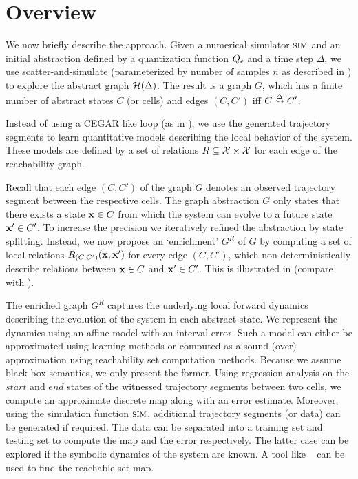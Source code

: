 \section{Overview}
\label{sec:ovw}

We now briefly describe the approach. Given a numerical simulator
$\mbox{\sc sim}$ and an initial abstraction defined by a quantization
function $Q_\epsilon$ and a time step $\Delta$, we use
scatter-and-simulate (parameterized by number of samples $n$ as
described in ) to explore the abstract graph
$\mathcal{H}(\Delta)$. The result is a graph $G$, which has a finite
number of abstract states $C$ (or cells) and edges $(C,C')$ iff $C
\overset{\Delta}{\rightsquigarrow} C'$.

Instead of using a CEGAR like loop (as in ), we use the
generated trajectory segments to learn quantitative models describing
the local behavior of the system. These models are defined by a set of
relations $R \subseteq \mathcal{X} \times \mathcal{X}$ for each
edge of the reachability graph.



Recall that each edge $(C,C')$ of the graph $G$ denotes an observed
trajectory segment between the respective cells. The graph abstraction
$G$ only states that there exists a state $\mathbf{x} \in C$ from which the
system can evolve to a future state $\mathbf{x}' \in C'$. To increase the
precision we iteratively refined the abstraction by state
splitting. Instead, we now propose an `enrichment' $G^R$ of $G$ by computing a
set of local relations $R_{(C,C')}(\mathbf{x},\mathbf{x}')$ for every edge $(C,C')$,
which non-deterministically describe relations between $\mathbf{x} \in C$ and $\mathbf{x}'
\in C'$. This is illustrated in  (compare with
).

The enriched graph $G^R$ captures the underlying local forward
dynamics describing the evolution of the system in each abstract
state. We represent the dynamics using an affine model with an
interval error. Such a model can either be approximated using learning
methods or computed as a sound (over) approximation using reachability
set computation methods. Because we assume black box semantics, we
only present the former. Using regression analysis on the $start$ and
$end$ states of the witnessed trajectory segments between two cells,
we compute an approximate discrete map along with an error estimate.
Moreover, using the simulation function $\mbox{\sc sim}$, additional
trajectory segments (or data) can be generated if required. The data
can be separated into a training set and testing set to compute the
map and the error respectively.  The latter case can be explored if
the symbolic dynamics of the system are known. A tool like
\flowstar~\cite{chen2013flow} can be used to find the reachable set
map.

